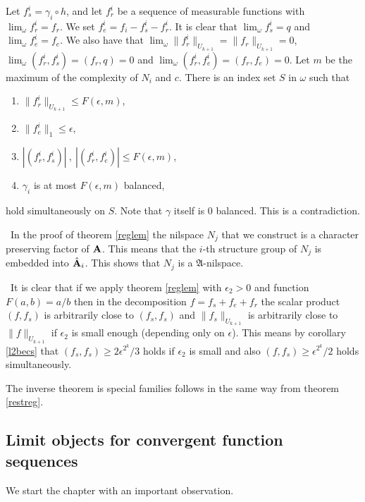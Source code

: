 \documentclass [11pt] {article}
\def\bA{{\bf A}}
\begin{document}
Let $f^i_s=\gamma_i\circ h$, and let $f^i_r$ be a sequence of measurable functions with $\lim_\omega f^i_r=f_r$.
We set $f^i_e=f_i-f^i_s-f^i_r$. It is clear that $\lim_\omega f^i_s=q$ and $\lim_\omega f^i_e=f_e$.
We also have that $\lim_\omega\|f^i_r\|_{U_{k+1}}=\|f_r\|_{U_{k+1}}=0$, $\lim_\omega (f^i_r,f^i_s)=(f_r,q)=0$ and $\lim_\omega(f^i_r,f^i_e)=(f_r,f_e)=0$.
Let $m$ be the maximum of the complexity of $N_i$ and $c$.
There is an index set $S$ in $\omega$ such that 
\begin{enumerate}
\item $\|f^i_r\|_{U_{k+1}}\leq F(\epsilon,m)$,
\item $\|f^i_e\|_1\leq \epsilon$,
\item $|(f^i_r,f^i_s)|~,~|(f^i_r,f^i_e)|\leq F(\epsilon,m)$,
\item $\gamma_i$ is at most $F(\epsilon,m)$ balanced,
\end{enumerate}
hold simultaneously on $S$.
Note that $\gamma$ itself is $0$ balanced.
This is a contradiction.

\bigskip

~In the proof of theorem \ref{reglem} the nilspace $N_j$ that we construct is a character preserving factor of $\bA$. This means that the $i$-th structure group of $N_j$ is embedded into $\hat{\bA}_i$. This shows that $N_j$ is a $\mathfrak{A}$-nilspace. 

\bigskip

~It is clear that if we apply theorem \ref{reglem} with $\epsilon_2>0$ and function $F(a,b)=a/b$ then in the decomposition $f=f_s+f_e+f_r$ the scalar product $(f,f_s)$ is arbitrarily close to $(f_s,f_s)$ and $\|f_s\|_{U_{k+1}}$ is arbitrarily close to $\|f\|_{U_{k+1}}$ if $\epsilon_2$ is small enough (depending only on $\epsilon$). This means by corollary \ref{l2becs} that $(f_s,f_s)\geq2\epsilon^{2^k}/3$ holds if $\epsilon_2$ is small and also $(f,f_s)\geq\epsilon^{2^k}/2$ holds simultaneously.

The inverse theorem is special families follows in the same way from theorem \ref{restreg}.

\subsection{Limit objects for convergent function sequences}

We start the chapter with an important observation.
\end{document}
